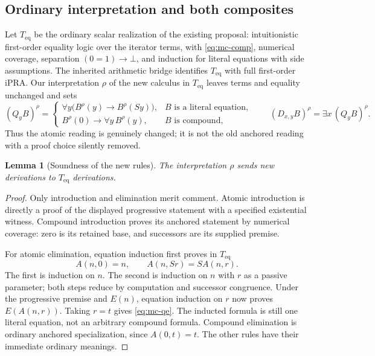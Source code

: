 \documentclass[11pt,letterpaper]{article}
\newtheorem{lemma}[theorem]{Lemma}
\theoremstyle{definition}
\theoremstyle{remark}
\begin{document}
\subsection{Ordinary interpretation and both composites}

Let $T_{\mathrm{eq}}$ be the ordinary scalar realization of the existing
proposal: intuitionistic first-order equality logic over the iterator
terms, with \eqref{eq:mc-comp}, numerical coverage, separation
$(0=1)\to\bot$, and induction for literal equations with side assumptions.
The inherited arithmetic bridge identifies $T_{\mathrm{eq}}$ with
full first-order iPRA.  Our interpretation $\rho$ of the new calculus
in $T_{\mathrm{eq}}$ leaves terms and equality unchanged and sets
\[
 (Q_yB)^\rho=
 \begin{cases}
 \forall y\bigl(B^\rho(y)\to B^\rho(Sy)\bigr),
       &B\text{ is a literal equation},\\
 B^\rho(0)\to\forall y\,B^\rho(y),&B\text{ is compound},
 \end{cases}
 \qquad
 (D_{x,y}B)^\rho=\exists x\,(Q_yB)^\rho.
 \tag{MC10}\label{eq:mc-reading}
\]
Thus the atomic reading is genuinely changed; it is not the old
anchored reading with a proof choice silently removed.

\begin{lemma}[Soundness of the new rules]
\label{lem:mc-sound}
The interpretation $\rho$ sends new derivations to
$T_{\mathrm{eq}}$ derivations.
\end{lemma}
\begin{proof}
Only introduction and elimination merit comment.  Atomic introduction
is directly a proof of the displayed progressive statement with a
specified existential witness.  Compound introduction proves its
anchored statement by numerical coverage: zero is its retained base,
and successors are its supplied premise.

For atomic elimination, equation induction first proves in
$T_{\mathrm{eq}}$
\[
 A(n,0)=n,\qquad A(n,Sr)=S A(n,r).
\]
The first is induction on $n$.  The second is induction on $n$ with
$r$ as a passive parameter; both steps reduce by computation and
successor congruence.  Under the progressive premise and $E(n)$,
equation induction on $r$ now proves $E(A(n,r))$.  Taking $r=t$
gives \eqref{eq:mc-qe}.  The inducted formula is still one literal
equation, not an arbitrary compound formula.  Compound elimination
is ordinary anchored specialization, since $A(0,t)=t$.
The other rules have their immediate ordinary meanings.
\end{proof}
\end{document}
